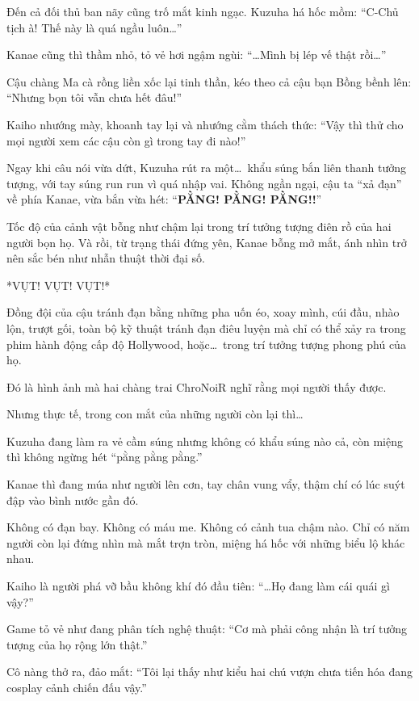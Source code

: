 \documentclass[../main.tex]{subfiles}
\begin{document}
Đến cả đối thủ ban nãy cũng trố mắt kinh ngạc. Kuzuha há hốc mồm: ``C-Chủ tịch à! Thế này là quá ngầu luôn\dots''

Kanae cũng thì thầm nhỏ, tỏ vẻ hơi ngậm ngùi: ``\dots Mình bị lép vế thật rồi\dots''

Cậu chàng Ma cà rồng liền xốc lại tinh thần, kéo theo cả cậu bạn Bồng bềnh lên: ``Nhưng bọn tôi vẫn chưa hết đâu!''

Kaiho nhướng mày, khoanh tay lại và nhướng cằm thách thức: ``Vậy thì thử cho mọi người xem các cậu còn gì trong tay đi nào!''

Ngay khi câu nói vừa dứt, Kuzuha rút ra một\dots\ khẩu súng bắn liên thanh tưởng tượng, với tay súng run run vì quá nhập vai. Không ngần ngại, cậu ta ``xả đạn'' về phía Kanae, vừa bắn vừa hét: ``\textbf{PẰNG! PẰNG! PẰNG!!}''


Tốc độ của cảnh vật bỗng như chậm lại trong trí tưởng tượng điên rồ của hai người bọn họ. Và rồi, từ trạng thái đứng yên, Kanae bỗng mở mắt, ánh nhìn trở nên sắc bén như nhẫn thuật thời đại số.

*VỤT! VỤT! VỤT!*

Đồng đội của cậu tránh đạn bằng những pha uốn éo, xoay mình, cúi đầu, nhào lộn, trượt gối, toàn bộ kỹ thuật tránh đạn điêu luyện mà chỉ có thể xảy ra trong phim hành động cấp độ Hollywood, hoặc\dots\ trong trí tưởng tượng phong phú của họ.


Đó là hình ảnh mà hai chàng trai ChroNoiR nghĩ rằng mọi người thấy được.

Nhưng thực tế, trong con mắt của những người còn lại thì\dots

Kuzuha đang làm ra vẻ cầm súng nhưng không có khẩu súng nào cả, còn miệng thì không ngừng hét ``pằng pằng pằng.''

Kanae thì đang múa như người lên cơn, tay chân vung vẩy, thậm chí có lúc suýt đập vào bình nước gần đó.

Không có đạn bay. Không có máu me. Không có cảnh tua chậm nào. Chỉ có năm người còn lại đứng nhìn mà mắt trợn tròn, miệng há hốc với những biểu lộ khác nhau.

Kaiho là người phá vỡ bầu không khí đó đầu tiên: ``\dots Họ đang làm cái quái gì vậy?''

Game tỏ vẻ như đang phân tích nghệ thuật: ``Cơ mà phải công nhận là trí tưởng tượng của họ rộng lớn thật.''

Cô nàng thở ra, đảo mắt: ``Tôi lại thấy như kiểu hai chú vượn chưa tiến hóa đang cosplay cảnh chiến đấu vậy.''
\end{document}
